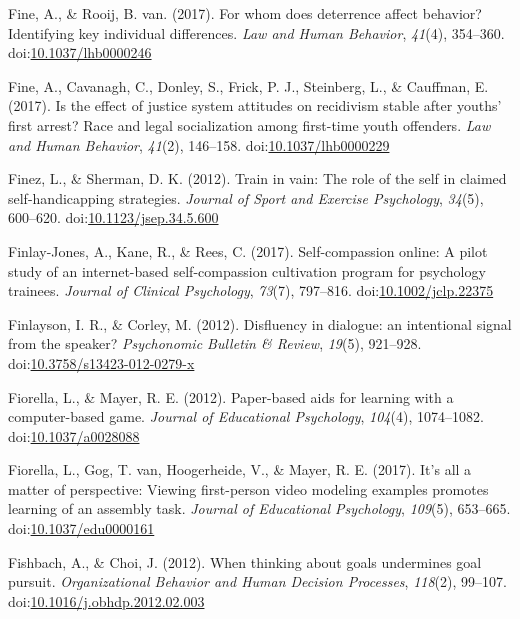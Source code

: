 \documentclass[english,man]{apa6}
\theoremstyle{definition}
\theoremstyle{definition}
\theoremstyle{definition}
\theoremstyle{remark}
\begin{document}
\hypertarget{ref-Fine2017a}{}
Fine, A., \& Rooij, B. van. (2017). For whom does deterrence affect
behavior? Identifying key individual differences. \emph{Law and Human
Behavior}, \emph{41}(4), 354--360.
doi:\href{https://doi.org/10.1037/lhb0000246}{10.1037/lhb0000246}

\hypertarget{ref-Fine2017}{}
Fine, A., Cavanagh, C., Donley, S., Frick, P. J., Steinberg, L., \&
Cauffman, E. (2017). Is the effect of justice system attitudes on
recidivism stable after youths' first arrest? Race and legal
socialization among first-time youth offenders. \emph{Law and Human
Behavior}, \emph{41}(2), 146--158.
doi:\href{https://doi.org/10.1037/lhb0000229}{10.1037/lhb0000229}

\hypertarget{ref-Finez2012}{}
Finez, L., \& Sherman, D. K. (2012). Train in vain: The role of the self
in claimed self-handicapping strategies. \emph{Journal of Sport and
Exercise Psychology}, \emph{34}(5), 600--620.
doi:\href{https://doi.org/10.1123/jsep.34.5.600}{10.1123/jsep.34.5.600}

\hypertarget{ref-Finlay-Jones2017}{}
Finlay-Jones, A., Kane, R., \& Rees, C. (2017). Self-compassion online:
A pilot study of an internet-based self-compassion cultivation program
for psychology trainees. \emph{Journal of Clinical Psychology},
\emph{73}(7), 797--816.
doi:\href{https://doi.org/10.1002/jclp.22375}{10.1002/jclp.22375}

\hypertarget{ref-Finlayson2012}{}
Finlayson, I. R., \& Corley, M. (2012). Disfluency in dialogue: an
intentional signal from the speaker? \emph{Psychonomic Bulletin \&
Review}, \emph{19}(5), 921--928.
doi:\href{https://doi.org/10.3758/s13423-012-0279-x}{10.3758/s13423-012-0279-x}

\hypertarget{ref-Fiorella2012}{}
Fiorella, L., \& Mayer, R. E. (2012). Paper-based aids for learning with
a computer-based game. \emph{Journal of Educational Psychology},
\emph{104}(4), 1074--1082.
doi:\href{https://doi.org/10.1037/a0028088}{10.1037/a0028088}

\hypertarget{ref-Fiorella2017}{}
Fiorella, L., Gog, T. van, Hoogerheide, V., \& Mayer, R. E. (2017). It's
all a matter of perspective: Viewing first-person video modeling
examples promotes learning of an assembly task. \emph{Journal of
Educational Psychology}, \emph{109}(5), 653--665.
doi:\href{https://doi.org/10.1037/edu0000161}{10.1037/edu0000161}

\hypertarget{ref-Fishbach2012}{}
Fishbach, A., \& Choi, J. (2012). When thinking about goals undermines
goal pursuit. \emph{Organizational Behavior and Human Decision
Processes}, \emph{118}(2), 99--107.
doi:\href{https://doi.org/10.1016/j.obhdp.2012.02.003}{10.1016/j.obhdp.2012.02.003}
\end{document}
